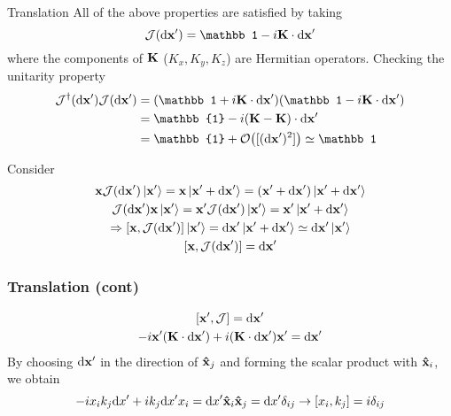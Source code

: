 \begin{frame}{Translation}
	All of the above properties are satisfied by taking
	\[
		\mathcal{J}(\dd{\vb x'}) = \mathbb 1 - i\vb{K} \cdot \dd{\vb x'}
	\]
	where the components of $\vb K$ ($K_x, K_y, K_z$) are Hermitian operators.
	Checking the unitarity property
	\begin{align*}
		\mathcal{J}^\dag(\dd{\vb x'}) \mathcal{J}(\dd{\vb x'}) & = (\mathbb 1 + i\vb K \cdot  \dd{\vb x'})(\mathbb 1 - i\vb K \cdot  \dd{\vb x'}) \\
		                                                       & = \mathbb{1} - i(\vb K - \vb K)\cdot \dd{\vb x'}                                 \\
		                                                       & = \mathbb{1} + \order{[(\dd{\vb x'})^2]} \simeq \mathbb 1
	\end{align*}

	Consider
	\begin{gather*}
		\vb x \mathcal{J}(\dd{\vb x'})\ket{\vb x'} = \vb x	\ket{\vb x' + \dd{\vb x'}} = (\vb x' + \dd{\vb x'})\ket{\vb x' + \dd{\vb x'}}\\
		\mathcal{J}(\dd{\vb x'}) \vb x \ket{\vb x'} = \vb x' \mathcal{J}(\dd{\vb x'}) \ket{\vb x'} = \vb x' \ket{\vb x' + \dd{\vb x'}}\\
		\Rightarrow \comm{\vb x}{\mathcal{J}(\dd{\vb x'})} \ket{\vb x'} = \dd{\vb x'} \ket{\vb x' + \dd{\vb x'}} \simeq \dd{\vb x'} \ket{\vb x'}\\
		\comm{\vb x}{\mathcal{J}(\dd{\vb x'})}  = \dd{\vb x'}
	\end{gather*}

\end{frame}

\begin{frame}
	\frametitle{Translation (cont)}
	\begin{gather*}
		\comm{\vb x'}{\mathcal{J}} = \dd{\vb x'}\\
		-i\vb x' (\vb K \cdot \dd{\vb x'}) + i(\vb K \cdot \dd{\vb x'})\vb x' = \dd{\vb x'}
	\end{gather*}
	By choosing $\dd \vb x'$ in the direction of $\vu x_j$ and forming the scalar product with $\vu x_i$, we obtain
	\[
		-ix_i k_j \dd x' + ik_j \dd x' x_i  = \dd x' \vu x_i \vu x_j =\dd x' \delta_{ij} \to \comm{x_i}{k_j} = i \delta_{ij}
	\]

\end{frame}

